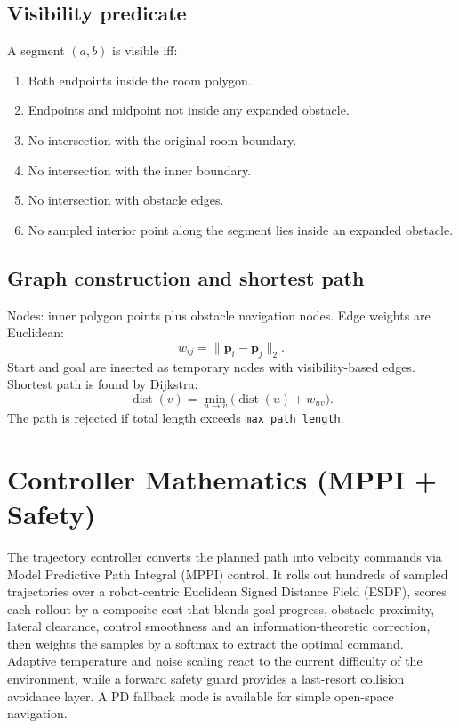 \documentclass[a4paper, 11pt]{article}
\newcommand{\vect}[1]{\bm{#1}}
\begin{document}
\subsection{Visibility predicate}

A segment $(a, b)$ is visible iff:
\begin{enumerate}
  \item Both endpoints inside the room polygon.
  \item Endpoints and midpoint not inside any expanded obstacle.
  \item No intersection with the original room boundary.
  \item No intersection with the inner boundary.
  \item No intersection with obstacle edges.
  \item No sampled interior point along the segment lies inside an expanded
        obstacle.
\end{enumerate}

\subsection{Graph construction and shortest path}

Nodes: inner polygon points plus obstacle navigation nodes.
Edge weights are Euclidean:
\begin{equation}
  w_{ij} = \|\vect{p}_i - \vect{p}_j\|_2.
\end{equation}
Start and goal are inserted as temporary nodes with visibility-based
edges.  Shortest path is found by Dijkstra:
\begin{equation}
  \operatorname{dist}(v)
  = \min_{u \to v}\bigl(\operatorname{dist}(u) + w_{uv}\bigr).
\end{equation}
The path is rejected if total length exceeds
\texttt{max\_path\_length}.

\section{Controller Mathematics (MPPI + Safety)}\label{sec:controller}

The trajectory controller converts the planned path into velocity
commands via Model Predictive Path Integral (MPPI) control.  It rolls
out hundreds of sampled trajectories over a robot-centric Euclidean
Signed Distance Field (ESDF), scores each rollout by a composite cost
that blends goal progress, obstacle proximity, lateral clearance,
control smoothness and an information-theoretic correction, then
weights the samples by a softmax to extract the optimal command.
Adaptive temperature and noise scaling react to the current difficulty
of the environment, while a forward safety guard provides a last-resort
collision avoidance layer.  A PD fallback mode is available for simple
open-space navigation.
\end{document}

